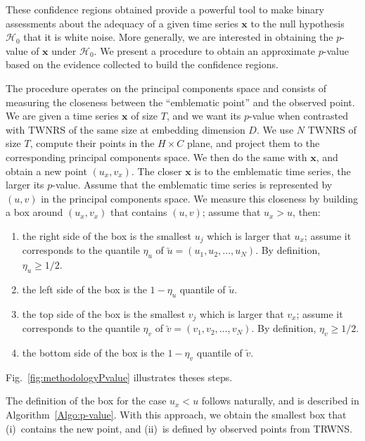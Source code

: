 
These confidence regions obtained provide a powerful tool to make binary assessments about the adequacy of a given time series $\bm x$ to the null hypothesis $\mathcal H_0$ that it is white noise.
More generally, we are interested in obtaining the $p$-value of $\bm x$ under $\mathcal H_0$.
We present a procedure to obtain an approximate $p$-value based on the evidence collected to build the confidence regions.

The procedure operates on the principal components space and consists of measuring the closeness between the ``emblematic point'' and the observed point.
We are given a time series $\bm x$ of size $T$, and we want its $p$-value when contrasted with TWNRS of the same size at embedding dimension $D$.
We use $N$ TWNRS of size $T$, compute their points in the $H\times C$ plane, and project them to the corresponding principal components space.
We then do the same with $\bm x$, and obtain a new point $(u_x,v_x)$.
The closer $\bm x$ is to the emblematic time series, the larger its $p$-value.
Assume that the emblematic time series is represented by $(u,v)$ in the principal components space.
We measure this closeness by building a box around $(u_x,v_x)$ that contains $(u,v)$; assume that $u_x>u$, then:
\begin{enumerate}
	\item the right side of the box is the smallest $u_j$ which is larger that $u_x$; assume it corresponds to the quantile $\eta_u$ of $\utilde u = (u_1,u_2,\dots, u_N)$. By definition, $\eta_u\geq 1/2$.
	\item the left side of the box is the $1-\eta_u$ quantile of $\utilde u$.
	\item the top side of the box is the smallest $v_j$ which is larger that $v_x$; assume it corresponds to the quantile $\eta_v$ of $\utilde v = (v_1,v_2,\dots, v_N)$. By definition, $\eta_v\geq 1/2$.
	\item the bottom side of the box is the $1-\eta_v$ quantile of $\utilde v$.
\end{enumerate}
Fig.~\ref{fig:methodologyPvalue} illustrates theses steps.

The definition of the box for the case $u_x<u$ follows naturally, and is described in Algorithm~\ref{Algo:p-value}.
With this approach, we obtain the smallest box that (i)~contains the new point, and (ii)~is defined by observed points from TRWNS.

